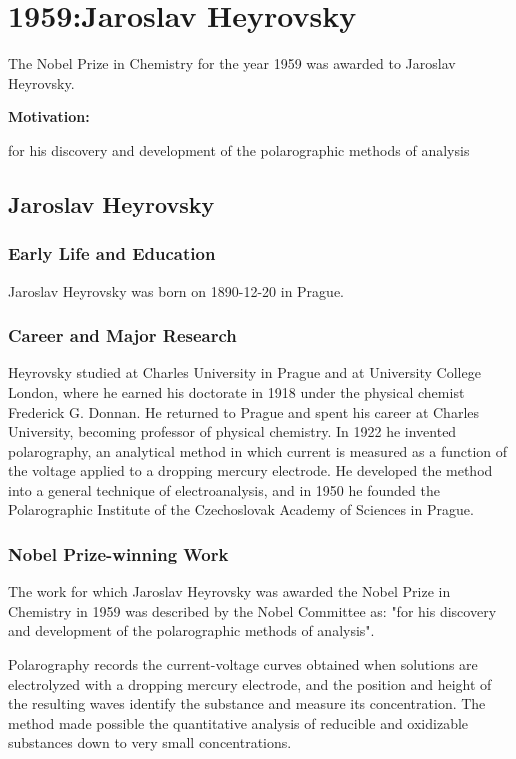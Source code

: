\chapter{1959:Jaroslav Heyrovsky}

\label{chap:chemistry1959}

The Nobel Prize in Chemistry for the year 1959 was awarded to Jaroslav Heyrovsky.

\textbf{Motivation:}

for his discovery and development of the polarographic methods of analysis

\section{Jaroslav Heyrovsky}

\subsection*{Early Life and Education}

Jaroslav Heyrovsky was born on 1890-12-20 in Prague.

\subsection*{Career and Major Research}

Heyrovsky studied at Charles University in Prague and at University College London, where he earned his doctorate in 1918 under the physical chemist Frederick G. Donnan. He returned to Prague and spent his career at Charles University, becoming professor of physical chemistry. In 1922 he invented polarography, an analytical method in which current is measured as a function of the voltage applied to a dropping mercury electrode. He developed the method into a general technique of electroanalysis, and in 1950 he founded the Polarographic Institute of the Czechoslovak Academy of Sciences in Prague.

\subsection*{Nobel Prize-winning Work}

The work for which Jaroslav Heyrovsky was awarded the Nobel Prize in Chemistry in 1959 was described by the Nobel Committee as: "for his discovery and development of the polarographic methods of analysis".

Polarography records the current-voltage curves obtained when solutions are electrolyzed with a dropping mercury electrode, and the position and height of the resulting waves identify the substance and measure its concentration. The method made possible the quantitative analysis of reducible and oxidizable substances down to very small concentrations.

